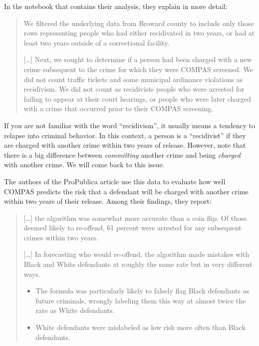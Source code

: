 In the notebook that contains their analysis, they explain in more
detail:

\begin{quote}
We filtered the underlying data from Broward county to include only
those rows representing people who had either recidivated in two years,
or had at least two years outside of a correctional facility.

{[}\ldots{]} Next, we sought to determine if a person had been charged
with a new crime subsequent to the crime for which they were COMPAS
screened. We did not count traffic tickets and some municipal ordinance
violations as recidivism. We did not count as recidivists people who
were arrested for failing to appear at their court hearings, or people
who were later charged with a crime that occurred prior to their COMPAS
screening.
\end{quote}

If you are not familiar with the word ``recidivism'', it usually means a
tendency to relapse into criminal behavior. In this context, a person is
a ``recidivist'' if they are charged with another crime within two years
of release. However, note that there is a big difference between
\emph{committing} another crime and being \emph{charged} with another
crime. We will come back to this issue.

The authors of the ProPublica article use this data to evaluate how well
COMPAS predicts the risk that a defendant will be charged with another
crime within two years of their release. Among their findings, they
report:

\begin{quote}
{[}\ldots{]} the algorithm was somewhat more accurate than a coin flip.
Of those deemed likely to re-offend, 61 percent were arrested for any
subsequent crimes within two years.

{[}\ldots{]} In forecasting who would re-offend, the algorithm made
mistakes with Black and White defendants at roughly the same rate but in
very different ways.

\begin{itemize}
\item
  The formula was particularly likely to falsely flag Black defendants
  as future criminals, wrongly labeling them this way at almost twice
  the rate as White defendants.
\item
  White defendants were mislabeled as low risk more often than Black
  defendants.
\end{itemize}
\end{quote}


